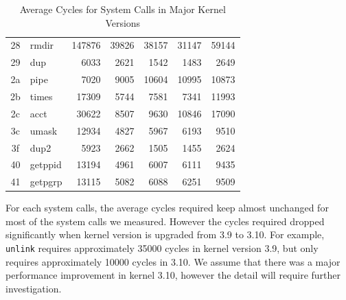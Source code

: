 \documentclass{article}
\begin{document}
\begin{table}
\begin{tabular}{clrrrrr}
        28 & rmdir & 147876 & 39826 & 38157 & 31147 & 59144 \\
        29 & dup & 6033 & 2621 & 1542 & 1483 & 2649 \\
        2a & pipe & 7020 & 9005 & 10604 & 10995 & 10873 \\
        2b & times & 17309 & 5744 & 7581 & 7341 & 11993 \\
        2c & acct & 30622 & 8507 & 9630 & 10846 & 17090 \\
        3c & umask & 12934 & 4827 & 5967 & 6193 & 9510 \\
        3f & dup2 & 5923 & 2662 & 1505 & 1455 & 2624 \\
        40 & getppid & 13194 & 4961 & 6007 & 6111 & 9435 \\
        41 & getpgrp & 13115 & 5082 & 6088 & 6251 & 9509 \\
        \bottomrule
    \end{tabular}
    \caption{\label{tab:mean} Average Cycles for System Calls in Major Kernel Versions}
\end{table}


For each system calls, the average cycles required keep almost unchanged for most of the system calls we measured.
However the cycles required dropped significantly when kernel version is upgraded from 3.9 to 3.10.
For example, \lstinline{unlink} requires approximately 35000 cycles in kernel version 3.9, but
only requires approximately 10000 cycles in 3.10. We assume that there was a major performance improvement in kernel 3.10,
however the detail will require further investigation.
\end{document}
